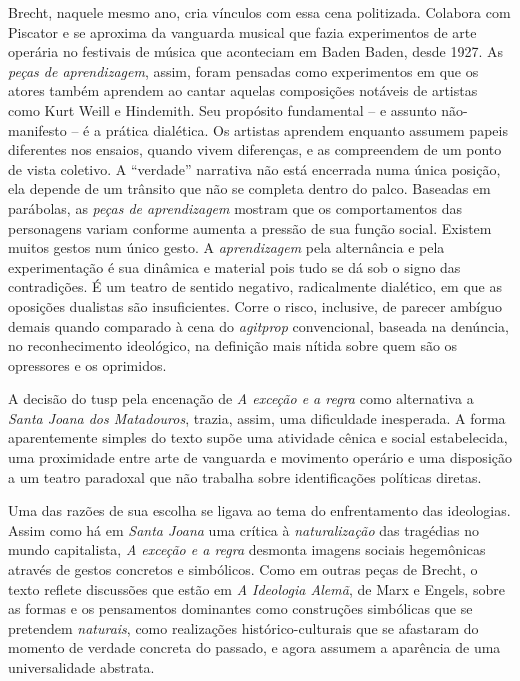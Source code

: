 Brecht, naquele mesmo ano, cria vínculos com essa cena politizada.
Colabora com Piscator e se aproxima da vanguarda musical que fazia
experimentos de arte operária no festivais de música que aconteciam em
Baden Baden, desde 1927. As {\it peças de aprendizagem}, assim, foram
pensadas como experimentos em que os atores também aprendem ao cantar
aquelas composições notáveis de artistas como Kurt Weill e Hindemith.
Seu propósito fundamental -- e assunto não-manifesto -- é a prática
dialética. Os artistas aprendem enquanto assumem papeis diferentes nos
ensaios, quando vivem diferenças, e as compreendem de um ponto de vista
coletivo. A “verdade” narrativa não está encerrada numa única posição,
ela depende de um trânsito que não se completa dentro do palco. Baseadas
em parábolas, as {\it peças de aprendizagem} mostram que os
comportamentos das personagens variam conforme aumenta a pressão de sua
função social. Existem muitos gestos num único gesto. A
{\it aprendizagem} pela alternância e pela experimentação é sua dinâmica
e material pois tudo se dá sob o signo das contradições. É um teatro de
sentido negativo, radicalmente dialético, em que as oposições dualistas
são insuficientes. Corre o risco, inclusive, de parecer ambíguo demais
quando comparado à cena do {\it agitprop} convencional, baseada na
denúncia, no reconhecimento ideológico, na definição mais nítida sobre
quem são os opressores e os oprimidos.

\subject{Estudo da peça: A exceção e a regra}

A decisão do {\sc tusp} pela encenação de {\it A exceção e a regra} como
alternativa a {\it Santa Joana dos Matadouros}, trazia, assim, uma
dificuldade inesperada. A forma aparentemente simples do texto supõe uma
atividade cênica e social estabelecida, uma proximidade entre arte de
vanguarda e movimento operário e uma disposição a um teatro paradoxal
que não trabalha sobre identificações políticas diretas.

Uma das razões de sua escolha se ligava ao tema do enfrentamento das
ideologias. Assim como há em {\it Santa Joana} uma crítica à
{\it naturalização} das tragédias no mundo capitalista, {\it A exceção e
a regra} desmonta imagens sociais hegemônicas através de gestos
concretos e simbólicos. Como em outras peças de Brecht, o texto reflete
discussões que estão em {\it A Ideologia Alemã}, de Marx e Engels, sobre
as formas e os pensamentos dominantes como construções simbólicas que se
pretendem {\it naturais}, como realizações histórico-culturais que se
afastaram do momento de verdade concreta do passado, e agora assumem a
aparência de uma universalidade abstrata.

